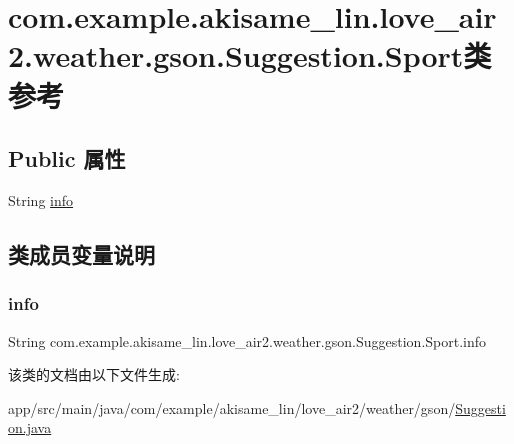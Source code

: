 \hypertarget{classcom_1_1example_1_1akisame__lin_1_1love__air2_1_1weather_1_1gson_1_1_suggestion_1_1_sport}{}\section{com.\+example.\+akisame\+\_\+lin.\+love\+\_\+air2.\+weather.\+gson.\+Suggestion.\+Sport类 参考}
\label{classcom_1_1example_1_1akisame__lin_1_1love__air2_1_1weather_1_1gson_1_1_suggestion_1_1_sport}
\subsection*{Public 属性}
\begin{DoxyCompactItemize}
\item 
String \mbox{\hyperlink{classcom_1_1example_1_1akisame__lin_1_1love__air2_1_1weather_1_1gson_1_1_suggestion_1_1_sport_a3166ae6798e9e7e5db3d8e0ba7f5bb83}{info}}
\end{DoxyCompactItemize}


\subsection{类成员变量说明}
\mbox{\label{classcom_1_1example_1_1akisame__lin_1_1love__air2_1_1weather_1_1gson_1_1_suggestion_1_1_sport_a3166ae6798e9e7e5db3d8e0ba7f5bb83}} 
\subsubsection{\texorpdfstring{info}{info}}
{\footnotesize\ttfamily String com.\+example.\+akisame\+\_\+lin.\+love\+\_\+air2.\+weather.\+gson.\+Suggestion.\+Sport.\+info}



该类的文档由以下文件生成\+:\begin{DoxyCompactItemize}
\item 
app/src/main/java/com/example/akisame\+\_\+lin/love\+\_\+air2/weather/gson/\mbox{\hyperlink{java_2com_2example_2akisame__lin_2love__air2_2weather_2gson_2_suggestion_8java}{Suggestion.\+java}}\end{DoxyCompactItemize}
